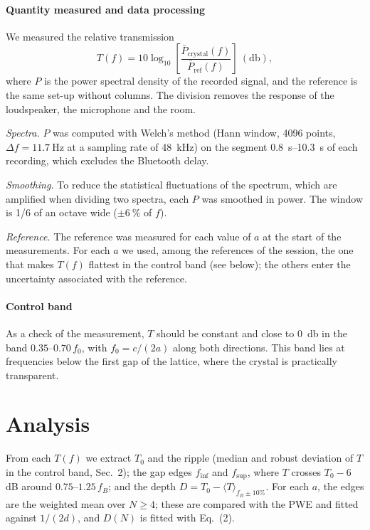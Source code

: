 \documentclass[9pt,a4paper,twocolumn]{extarticle}
\newcommand{\pbreak}{\par\vspace{3pt}}
\newcommand{\finf}{\ensuremath{f_{\mathrm{inf}}}}
\newcommand{\fsup}{\ensuremath{f_{\mathrm{sup}}}}
\begin{document}
\paragraph{Quantity measured and data processing}
We measured the relative transmission
\begin{equation}
  T(f) = 10\log_{10}\!\left[\frac{\bar P_{\mathrm{crystal}}(f)}{\bar P_{\mathrm{ref}}(f)}\right]\ (\si{\decibel}),
\end{equation}
where $P$ is the power spectral density of the recorded signal, and the reference is the same set-up without columns. The division removes the response of the loudspeaker, the microphone and the room.
\pbreak
\emph{Spectra.} $P$ was computed with Welch's method (Hann window, 4096 points, $\Delta f = \SI{11.7}{\hertz}$ at a sampling rate of \SI{48}{\kilo\hertz}) on the segment \SIrange{0.8}{10.3}{\second} of each recording, which excludes the Bluetooth delay.
\pbreak
\emph{Smoothing.} To reduce the statistical fluctuations of the spectrum, which are amplified when dividing two spectra, each $P$ was smoothed in power. The window is 1/6 of an octave wide ($\pm\SI{6}{\percent}$ of $f$).
\pbreak
\emph{Reference.} The reference was measured for each value of $a$ at the start of the measurements. For each $a$ we used, among the references of the session, the one that makes $T(f)$ flattest in the control band (see below); the others enter the uncertainty associated with the reference.

\paragraph{Control band}
As a check of the measurement, $T$ should be constant and close to \SI{0}{\decibel} in the band $0.35$--$0.70\,f_0$, with $f_0 = c/(2a)$ along both directions. This band lies at frequencies below the first gap of the lattice, where the crystal is practically transparent.

\section{Analysis}
From each $T(f)$ we extract $T_0$ and the ripple (median and robust deviation of $T$ in the control
band, Sec.~2); the gap edges \finf{} and \fsup{}, where $T$ crosses $T_0-6$\,dB around $0.75$--$1.25\,f_B$; and the depth $D=T_0-\langle T\rangle_{f_B\pm10\%}$. For each $a$, the edges
are the weighted mean over $N\ge4$; these are
compared with the PWE and fitted against $1/(2d)$, and $D(N)$ is fitted with Eq.~(2).
\end{document}

